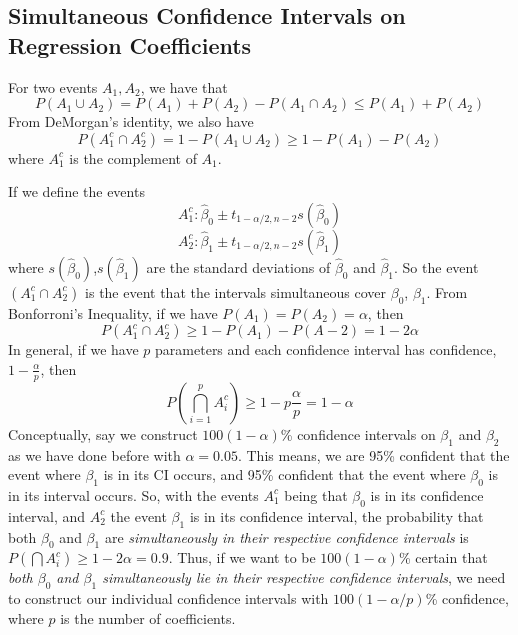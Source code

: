 \subsection{Simultaneous Confidence Intervals on Regression Coefficients}
\begin{theorem}
    For two events $A_1, A_2$, we have that 
    \[P(A_1 \cup A_2) = P(A_1) + P(A_2) - P(A_1 \cap A_2) \leq P(A_1) + P(A_2)\]
    From DeMorgan's identity, we also have 
    \[P(A_1^c \cap A_2^c) = 1 - P(A_1 \cup A_2) \geq 1 - P(A_1) - P(A_2)\]
    where $A_1^c$ is the complement of $A_1$.
\end{theorem}
\noindent
If we define the events 
\[A_1^c: \hat{\beta}_0 \pm t_{1-\alpha/2, n-2}s(\hat{\beta}_0)\]
\[A_2^c: \hat{\beta}_1 \pm t_{1-\alpha/2, n-2}s(\hat{\beta}_1)\]
where $s(\hat{\beta}_0)$,$s(\hat{\beta}_1)$ are the standard deviations of $\hat{\beta}_0$ and $\hat{\beta}_1$. So the event $(A_1^c \cap A_2^c)$ is the event that the intervals simultaneous cover $\beta_0$, $\beta_1$. From Bonforroni's Inequality, if we have $P(A_1) = P(A_2) = \alpha$, then 
\[P(A_1^c \cap A_2^c) \geq 1 - P(A_1) - P(A-2) = 1 - 2\alpha\]
In general, if we have $p$ parameters and each confidence interval has confidence, $1- \frac{\alpha}{p}$, then 
\[P\left(\bigcap_{i=1}^p A_i^c\right) \geq 1 - p\frac{\alpha}{p} = 1 - \alpha\]
Conceptually, say we construct $100(1-\alpha)$\% confidence intervals on $\beta_1$ and $\beta_2$ as we have done before with $\alpha = 0.05$. This means, we are 95\% confident that the event where $\beta_1$ is in its CI occurs, and 95\% confident that the event where $\beta_0$ is in its interval occurs. So, with the events $A_1^c$ being that $\beta_0$ is in its confidence interval, and $A_2^c$ the event $\beta_1$ is in its confidence interval, the probability that both $\beta_0$ and $\beta_1$ are \textit{simultaneously in their respective confidence intervals} is $P(\bigcap A_i^{c}) \geq 1 - 2\alpha = 0.9$. Thus, if we want to be $100(1-\alpha)$\% certain that \textit{both $\beta_0$ and $\beta_1$ simultaneously lie in their respective confidence intervals}, we need to construct our individual confidence intervals with $100(1 - \alpha/p)$\% confidence, where $p$ is the number of coefficients.




